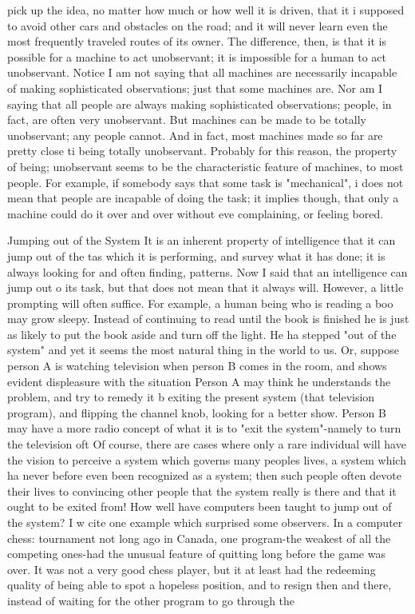 pick up the idea, no matter how much or how well it is driven, that it i supposed to avoid
other cars and obstacles on the road; and it will never learn even the most frequently
traveled routes of its owner.
        The difference, then, is that it is possible for a machine to act unobservant; it is
impossible for a human to act unobservant. Notice I am not saying that all machines are
necessarily incapable of making sophisticated observations; just that some machines are.
Nor am I saying that all people are always making sophisticated observations; people, in
fact, are often very unobservant. But machines can be made to be totally unobservant;
any people cannot. And in fact, most machines made so far are pretty close ti being
totally unobservant. Probably for this reason, the property of being; unobservant seems to
be the characteristic feature of machines, to most people. For example, if somebody says
that some task is "mechanical", i does not mean that people are incapable of doing the
task; it implies though, that only a machine could do it over and over without eve
complaining, or feeling bored.

                             Jumping out of the System
It is an inherent property of intelligence that it can jump out of the tas which it is
performing, and survey what it has done; it is always looking for and often finding,
patterns. Now I said that an intelligence can jump out o its task, but that does not mean
that it always will. However, a little prompting will often suffice. For example, a human
being who is reading a boo may grow sleepy. Instead of continuing to read until the book
is finished he is just as likely to put the book aside and turn off the light. He ha stepped
"out of the system" and yet it seems the most natural thing in the world to us. Or, suppose
person A is watching television when person B comes in the room, and shows evident
displeasure with the situation Person A may think he understands the problem, and try to
remedy it b exiting the present system (that television program), and flipping the channel
knob, looking for a better show. Person B may have a more radio concept of what it is to
"exit the system"-namely to turn the television oft Of course, there are cases where only a
rare individual will have the vision to perceive a system which governs many peoples
lives, a system which ha never before even been recognized as a system; then such people
often devote their lives to convincing other people that the system really is there and that
it ought to be exited from!
         How well have computers been taught to jump out of the system? I w cite one
example which surprised some observers. In a computer chess: tournament not long ago
in Canada, one program-the weakest of all the competing ones-had the unusual feature of
quitting long before the game was over. It was not a very good chess player, but it at least
had the redeeming quality of being able to spot a hopeless position, and to resign then
and there, instead of waiting for the other program to go through the




